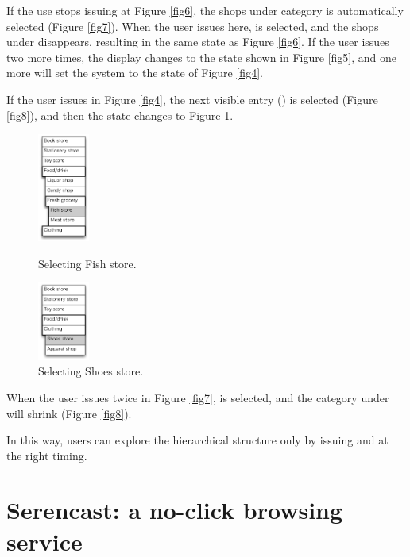 \documentclass[conference]{IEEEtran}
\def\up{\tsf{▲}}
\def\down{\tsf{▼}}
\begin{document}
If the use stops issuing {\down} at Figure \ref{fig6},
the shops under category  is automatically selected (Figure \ref{fig7}).
%
When the user issues {\up} here,  is selected,
and the shops under  disappears, 
resulting in the same state as Figure \ref{fig6}.
If the user issues {\up} two more times, the display changes to the state
shown in Figure \ref{fig5},
and one more {\up} will set the system to the state of Figure \ref{fig4}.

If the user issues {\down} in Figure \ref{fig4}, the next visible entry
() is selected (Figure \ref{fig8}), and then the state changes to Figure \ref{fig9}.

\begin{figure}[H]
  \begin{minipage}{0.45\hsize}
    \centerline{\includegraphics[width=17mm,bb=0 0 139 292]{figures/fig7.pdf}}
    \caption{Selecting Fish store.}
    \label{fig7}
  \end{minipage}
  \begin{minipage}{0.45\hsize}
    \centerline{\includegraphics[width=17mm,bb=0 0 139 211]{figures/fig9.pdf}}
    \caption{Selecting Shoes store.}
    \label{fig9}
  \end{minipage}
\end{figure}

When the user issues {\down} twice in Figure \ref{fig7},
 is selected, and the category under  will shrink (Figure \ref{fig8}).

In this way, users can explore the hierarchical structure
only by issuing {\up} and {\down} at the right timing.

\section{Serencast: a no-click browsing service}
\end{document}

